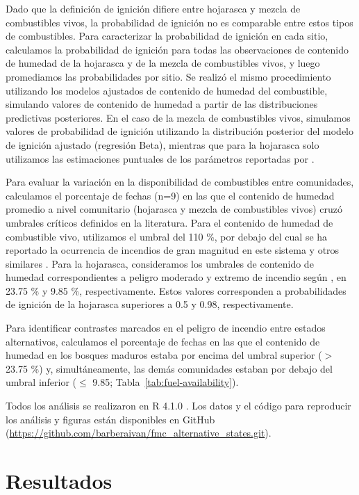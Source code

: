 Dado que la definición de ignición difiere entre hojarasca y mezcla de combustibles vivos, la probabilidad de ignición no es comparable entre estos tipos de combustibles. Para caracterizar la probabilidad de ignición en cada sitio, calculamos la probabilidad de ignición para todas las observaciones de contenido de humedad de la hojarasca y de la mezcla de combustibles vivos, y luego promediamos las probabilidades por sitio. Se realizó el mismo procedimiento utilizando los modelos ajustados de contenido de humedad del combustible, simulando valores de contenido de humedad a partir de las distribuciones predictivas posteriores. En el caso de la mezcla de combustibles vivos, simulamos valores de probabilidad de ignición utilizando la distribución posterior del modelo de ignición ajustado (regresión Beta), mientras que para la hojarasca solo utilizamos las estimaciones puntuales de los parámetros reportadas por \citet{bianchi_ignition_2014}.

Para evaluar la variación en la disponibilidad de combustibles entre comunidades, calculamos el porcentaje de fechas (n=9) en las que el contenido de humedad promedio a nivel comunitario (hojarasca y mezcla de combustibles vivos) cruzó umbrales críticos definidos en la literatura. Para el contenido de humedad de combustible vivo, utilizamos el umbral del 110 \%, por debajo del cual se ha reportado la ocurrencia de incendios de gran magnitud en este sistema y otros similares \citep{chuvieco_prediction_2009, bianchi_live_2015, arganaraz_determining_2018}. Para la hojarasca, consideramos los umbrales de contenido de humedad correspondientes a peligro moderado y extremo de incendio según \citet{bianchi_ignition_2014}, en 23.75 \% y 9.85 \%, respectivamente. Estos valores corresponden a probabilidades de ignición de la hojarasca superiores a 0.5 y 0.98, respectivamente.

Para identificar contrastes marcados en el peligro de incendio entre estados alternativos, calculamos el porcentaje de fechas en las que el contenido de humedad en los bosques maduros estaba por encima del umbral superior ($>$ 23.75 \%) y, simultáneamente, las demás comunidades estaban por debajo del umbral inferior ($\le$ 9.85; Tabla~\ref{tab:fuel-availability}).

Todos los análisis se realizaron en R 4.1.0 \citep{R}. Los datos y el código para reproducir los análisis y figuras están disponibles en GitHub (\url{https://github.com/barberaivan/fmc_alternative_states.git}).

\section{Resultados}

